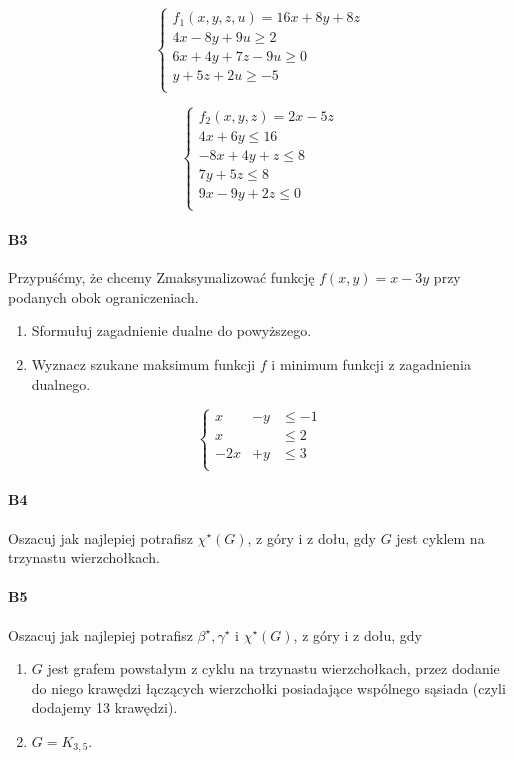 \documentclass[a4paper,12pt]{article}
\theoremstyle{definition}%
\theoremstyle{definition}
\theoremstyle{problem}
\begin{document}
\begin{minipage}{.5\textwidth}
$$\left\{\begin{matrix}
f_1(x, y, z, u) = 16x + 8y + 8z\\
4x - 8y + 9u \geq 2\\
6x + 4y + 7z - 9u \geq 0\\
y + 5z + 2u \geq -5\\
\end{matrix}\right.$$
\end{minipage}%
\begin{minipage}{.5\textwidth}
$$\left\{\begin{matrix}
f_2(x, y, z) = 2x - 5z\\
4x + 6y \leq 16\\
-8x + 4y + z \leq 8\\
7y + 5z \leq 8\\
9x - 9y + 2z \leq 0\\
\end{matrix}\right.$$
\end{minipage}



\paragraph{B3} Przypuśćmy, że chcemy Zmaksymalizować funkcję
$f(x, y) = x - 3y$ przy podanych obok ograniczeniach.
\begin{enumerate}[label=\alph*)]
\item Sformułuj zagadnienie dualne do powyższego.
\item Wyznacz szukane maksimum funkcji $f$ i minimum funkcji z zagadnienia dualnego.
\end{enumerate}
$$\left\{\begin{matrix}
x &- y &\leq -1\\
x &&\leq 2\\
-2x&+ y &\leq 3\\
\end{matrix}\right.$$

\paragraph{B4} Oszacuj jak najlepiej potrafisz $\chi ^\star(G)$, z góry i z dołu, gdy $G$ jest cyklem na trzynastu wierzchołkach.

\paragraph{B5} Oszacuj jak najlepiej potrafisz $\beta ^\star, \gamma ^\star \text{ i } \chi ^\star(G)$, z góry i z dołu, gdy
\begin{enumerate}[label=\alph*)]
\item  $G$ jest grafem powstałym z cyklu na trzynastu wierzchołkach, przez dodanie do niego krawędzi łączących wierzchołki posiadające wspólnego sąsiada (czyli dodajemy 13 krawędzi).
\item  $G = K_{3,5}$.
\end{enumerate}
\end{document}
